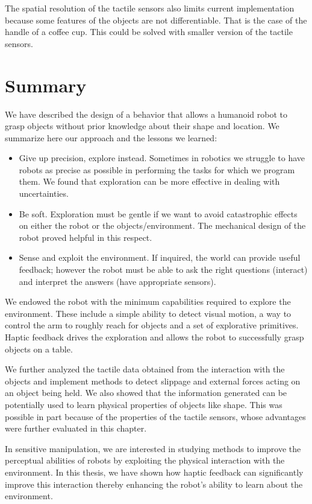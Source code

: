 The spatial resolution of the tactile sensors also limits current
implementation because some features of the objects are not
differentiable. That is the case of the handle of a coffee cup.
This could be solved with smaller version of the tactile sensors.



\section{Summary}
\label{sec:conclusions}

We have described the design of a behavior that allows a humanoid
robot to grasp objects without prior knowledge about their shape
and location. We summarize here our approach and the lessons we
learned:
%
\begin{itemize}
%
\item Give up precision, explore instead. Sometimes in robotics we
struggle to have robots as precise as possible in performing the
tasks for which we program them. We found that exploration can be
more effective in dealing with uncertainties.
%
\item Be soft. Exploration must be gentle if we want to avoid
catastrophic effects on either the robot or the
objects/environment. The mechanical design of the robot proved
helpful in this respect.
%
\item Sense and exploit the environment. If inquired, the world
can provide useful feedback; however the robot must be able to ask
the right questions (interact) and interpret the answers (have
appropriate sensors).
%
\end{itemize}

We endowed the robot with the minimum capabilities required to
explore the environment. These include a simple ability to detect
visual motion, a way to control the arm to roughly reach for
objects and a set of explorative primitives. Haptic feedback
drives the exploration and allows the robot to successfully grasp
objects on a table.

We further analyzed the tactile data obtained from the interaction
with the objects and implement methods to detect slippage and
external forces acting on an object being held. We also showed
that the information generated can be potentially used to learn
physical properties of objects like shape. This was possible in
part because of the properties of the tactile sensors, whose
advantages were further evaluated in this chapter.


In sensitive manipulation, we are interested in studying methods
to improve the perceptual abilities of robots by exploiting the
physical interaction with the environment. In this thesis, we have
shown how haptic feedback can significantly improve this
interaction thereby enhancing the robot's ability to learn about
the environment.

